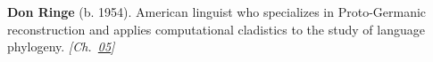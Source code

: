 \textbf{Don Ringe} (b. 1954). American linguist who specializes in Proto-Germanic reconstruction and applies computational cladistics to the study of language phylogeny. \emph{[Ch.~\hyperref[ch:circlewheel]{05}]}

